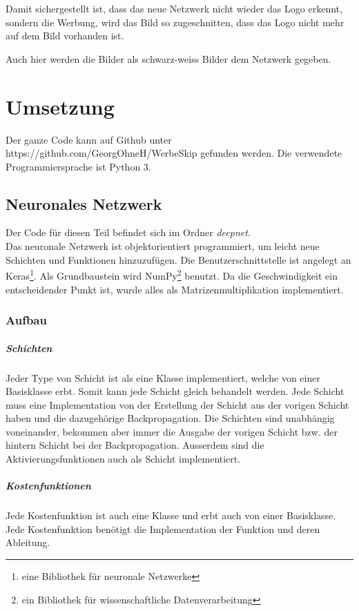 \documentclass[12pt,a4paper]{report}
\begin{document}
Damit sichergestellt ist, dass das neue Netzwerk nicht wieder das Logo erkennt, sondern die Werbung,
wird das Bild so zugeschnitten, dass das Logo nicht mehr auf dem Bild vorhanden ist.

Auch hier werden die Bilder als schwarz-weiss Bilder dem Netzwerk gegeben.


\chapter{Umsetzung}
\label{ch:umsetzung}
Der ganze Code kann auf Github unter https://github.com/GeorgOhneH/WerbeSkip gefunden werden.
Die verwendete Programmiersprache ist Python 3\cite{python}.
\section{Neuronales Netzwerk}
Der Code für diesen Teil befindet sich im Ordner \textit{deepnet}.\bigskip\\
    Das neuronale Netzwerk ist objektorientiert programmiert, um leicht neue Schichten und Funktionen hinzuzufügen.
Die Benutzerschnittstelle ist angelegt an Keras\cite{chollet2015keras}\footnote{eine Bibliothek für neuronale Netzwerke}.
Als Grundbaustein wird NumPy\cite{numpy}\footnote{ein Bibliothek für wissenschaftliche Datenverarbeitung} benutzt.
Da die Geschwindigkeit ein entscheidender Punkt ist, wurde alles als Matrizenmultiplikation implementiert.

\subsection{Aufbau}
\paragraph{Schichten}
Jeder Type von Schicht ist als eine Klasse implementiert, welche von einer Basisklasse erbt.
Somit kann jede Schicht gleich behandelt werden.
Jede Schicht muss eine Implementation von der Erstellung der Schicht aus der vorigen Schicht haben und die dazugehörige Backpropagation.
Die Schichten sind unabhängig voneinander, bekommen aber immer die Ausgabe der vorigen Schicht bzw. der hintern Schicht bei der Backpropagation.
Ausserdem sind die Aktivierungsfunktionen auch als Schicht implementiert.
\paragraph{Kostenfunktionen}
Jede Kostenfunktion ist auch eine Klasse und erbt auch von einer Basisklasse.
Jede Kostenfunktion benötigt die Implementation der Funktion und deren Ableitung.
\end{document}

